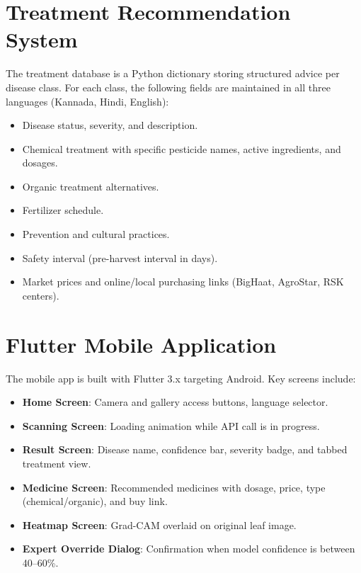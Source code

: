 \documentclass[12pt,a4paper]{report}
\begin{document}
\section{Treatment Recommendation System}
The treatment database is a Python dictionary storing structured advice per disease class. For each class, the following fields are maintained in all three languages (Kannada, Hindi, English):
\begin{itemize}
    \item Disease status, severity, and description.
    \item Chemical treatment with specific pesticide names, active ingredients, and dosages.
    \item Organic treatment alternatives.
    \item Fertilizer schedule.
    \item Prevention and cultural practices.
    \item Safety interval (pre-harvest interval in days).
    \item Market prices and online/local purchasing links (BigHaat, AgroStar, RSK centers).
\end{itemize}

\section{Flutter Mobile Application}
The mobile app is built with Flutter 3.x targeting Android. Key screens include:
\begin{itemize}
    \item \textbf{Home Screen}: Camera and gallery access buttons, language selector.
    \item \textbf{Scanning Screen}: Loading animation while API call is in progress.
    \item \textbf{Result Screen}: Disease name, confidence bar, severity badge, and tabbed treatment view.
    \item \textbf{Medicine Screen}: Recommended medicines with dosage, price, type (chemical/organic), and buy link.
    \item \textbf{Heatmap Screen}: Grad-CAM overlaid on original leaf image.
    \item \textbf{Expert Override Dialog}: Confirmation when model confidence is between 40--60\%.
\end{itemize}

\end{document}
